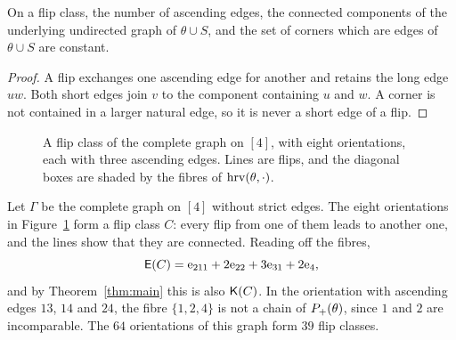 \begin{lemma}\label{lem:flipInvariants}
On a flip class, the number of ascending edges, the connected components of the
underlying undirected graph of $\theta\cup S$, and the set of corners which
are edges of $\theta\cup S$ are constant.
\end{lemma}

\begin{proof}
A flip exchanges one ascending edge for another and retains the long edge $uw$.
Both short edges join $v$ to the component containing $u$ and $w$.
A corner is not contained in a larger natural edge, so it is never a short edge
of a flip.
\end{proof}

\begin{figure}[!ht]
\centering
{}
\caption{A flip class of the complete graph on $[4]$, with eight orientations,
each with three ascending edges.
Lines are flips, and the diagonal boxes are shaded by the fibres of
$\operatorname{hrv}(\theta,\cdot)$.}
\label{fig:largerClass}
\end{figure}

\begin{example}\label{ex:largerClass}
Let $\Gamma$ be the complete graph on $[4]$ without strict edges.
The eight orientations in Figure~\ref{fig:largerClass} form a flip class $C$:
every flip from one of them leads to another one, and the lines show that they
are connected.
Reading off the fibres,
\[
 \mathsf{E}(C)=\mathrm{e}_{211}+2\mathrm{e}_{22}+3\mathrm{e}_{31}+2\mathrm{e}_4,
\]
and by Theorem~\ref{thm:main} this is also $\mathsf{K}(C)$.
In the orientation with ascending edges $13$, $14$ and $24$, the fibre
$\{1,2,4\}$ is not a chain of $P_{+}(\theta)$, since $1$ and $2$ are
incomparable.
The $64$ orientations of this graph form $39$ flip classes.
\end{example}

